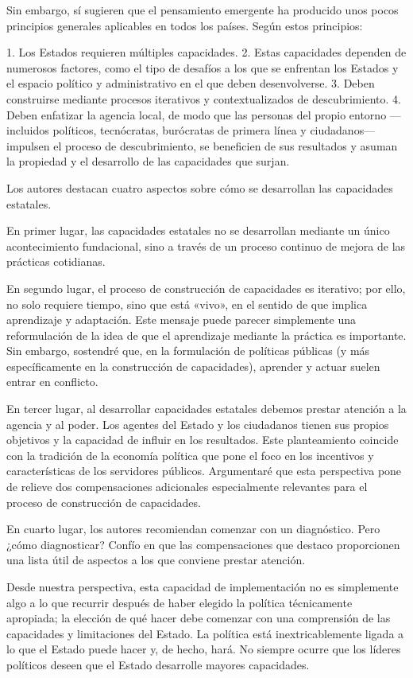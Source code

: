 \documentclass[10pt,a4paper]{article}
\begin{document}
Sin embargo, sí sugieren que el pensamiento emergente ha producido unos pocos principios generales aplicables en todos los países. Según estos principios:

1. Los Estados requieren múltiples capacidades.
2. Estas capacidades dependen de numerosos factores, como el tipo de desafíos a los que se enfrentan los Estados y el espacio político y administrativo en el que deben desenvolverse.
3. Deben construirse mediante procesos iterativos y contextualizados de descubrimiento.
4. Deben enfatizar la agencia local, de modo que las personas del propio entorno —incluidos políticos, tecnócratas, burócratas de primera línea y ciudadanos— impulsen el proceso de descubrimiento, se beneficien de sus resultados y asuman la propiedad y el desarrollo de las capacidades que surjan.

Los autores destacan cuatro aspectos sobre cómo se desarrollan las capacidades estatales.

En primer lugar, las capacidades estatales no se desarrollan mediante un único acontecimiento fundacional, sino a través de un proceso continuo de mejora de las prácticas cotidianas.

En segundo lugar, el proceso de construcción de capacidades es iterativo; por ello, no solo requiere tiempo, sino que está «vivo», en el sentido de que implica aprendizaje y adaptación. Este mensaje puede parecer simplemente una reformulación de la idea de que el aprendizaje mediante la práctica es importante. Sin embargo, sostendré que, en la formulación de políticas públicas (y más específicamente en la construcción de capacidades), aprender y actuar suelen entrar en conflicto.

En tercer lugar, al desarrollar capacidades estatales debemos prestar atención a la agencia y al poder. Los agentes del Estado y los ciudadanos tienen sus propios objetivos y la capacidad de influir en los resultados. Este planteamiento coincide con la tradición de la economía política que pone el foco en los incentivos y características de los servidores públicos. Argumentaré que esta perspectiva pone de relieve dos compensaciones adicionales especialmente relevantes para el proceso de construcción de capacidades.

En cuarto lugar, los autores recomiendan comenzar con un diagnóstico. Pero ¿cómo diagnosticar? Confío en que las compensaciones que destaco proporcionen una lista útil de aspectos a los que conviene prestar atención.

Desde nuestra perspectiva, esta capacidad de implementación no es simplemente algo a lo que recurrir después de haber elegido la política técnicamente apropiada; la elección de qué hacer debe comenzar con una comprensión de las capacidades y limitaciones del Estado. La política está inextricablemente ligada a lo que el Estado puede hacer y, de hecho, hará. No siempre ocurre que los líderes políticos deseen que el Estado desarrolle mayores capacidades.
\end{document}
